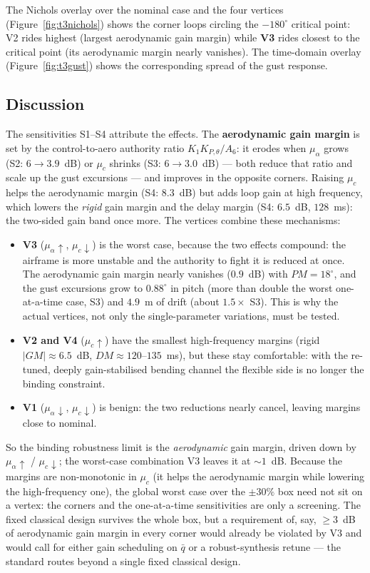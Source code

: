 \documentclass[../main.tex]{subfiles}
\begin{document}
The Nichols overlay over the nominal case and the four vertices
(Figure~\ref{fig:t3nichols}) shows the corner loops circling the $-180^\circ$
critical point: V2 rides highest (largest aerodynamic gain margin) while
\textbf{V3} rides closest to the critical point (its aerodynamic margin nearly
vanishes). The time-domain overlay (Figure~\ref{fig:t3gust}) shows the
corresponding spread of the gust response.

\subsection{Discussion}

The sensitivities S1--S4 attribute the effects. The \textbf{aerodynamic gain
margin} is set by the control-to-aero authority ratio $K_1 K_{P,\theta}/A_6$: it
erodes when $\mu_\alpha$ grows (S2: $6\to3.9$~dB) or $\mu_c$ shrinks
(S3: $6\to3.0$~dB) --- both reduce that ratio and scale up the gust excursions ---
and improves in the opposite corners. Raising $\mu_c$ helps the aerodynamic
margin (S4: $8.3$~dB) but adds loop gain at high frequency, which lowers the
\emph{rigid} gain margin and the delay margin (S4: $6.5$~dB, $128$~ms): the
two-sided gain band once more. The vertices combine these mechanisms:

\begin{itemize}
\item \textbf{V3} ($\mu_\alpha\!\uparrow$, $\mu_c\!\downarrow$) is the worst case,
because the two effects compound: the airframe is more unstable and the authority
to fight it is reduced at once. The aerodynamic gain margin nearly vanishes
($0.9$~dB) with $PM = 18^\circ$, and the gust excursions grow to $0.88^\circ$ in
pitch (more than double the worst one-at-a-time case, S3) and $4.9$~m of drift
(about $1.5\times$ S3).
This is why the actual vertices, not only the single-parameter variations, must
be tested.
\item \textbf{V2 and V4} ($\mu_c\!\uparrow$) have the smallest high-frequency
margins (rigid $|GM|\approx6.5$~dB, $DM\approx120$--$135$~ms), but these stay
comfortable: with the re-tuned, deeply gain-stabilised bending channel the
flexible side is no longer the binding constraint.
\item \textbf{V1} ($\mu_\alpha\!\downarrow$, $\mu_c\!\downarrow$) is benign: the
two reductions nearly cancel, leaving margins close to nominal.
\end{itemize}

So the binding robustness limit is the \emph{aerodynamic} gain margin, driven
down by $\mu_\alpha\!\uparrow$ / $\mu_c\!\downarrow$; the worst-case combination
V3 leaves it at $\sim1$~dB. Because the margins are non-monotonic in $\mu_c$ (it
helps the aerodynamic margin while lowering the high-frequency one), the global
worst case over the $\pm 30\%$ box need not sit on a vertex: the corners and the
one-at-a-time sensitivities are only a screening. The fixed classical design
survives the whole box, but a requirement of, say, $\ge 3$~dB of aerodynamic gain
margin in every corner would already be violated by V3 and would call for either
gain scheduling on $\bar q$ or a robust-synthesis retune --- the standard routes
beyond a single fixed classical design.
\end{document}
